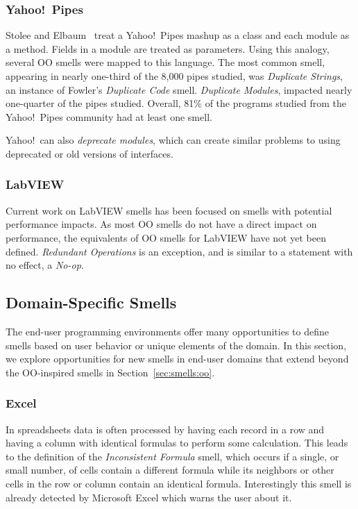 \documentclass{sig-alternate}
\begin{document}
\subsubsection{Yahoo!\ Pipes}
Stolee and Elbaum~\cite{Stolee2011, StoleeTSE2013} treat a Yahoo!\ Pipes mashup as a class and each module as a method.  Fields in a module are treated as parameters. Using this analogy,  several OO smells were mapped to this language. The most common smell, appearing in nearly one-third of the 8,000 pipes studied, was \emph{Duplicate Strings}, an instance of Fowler's \emph{Duplicate Code} smell. 
\emph{Duplicate Modules}, impacted nearly one-quarter of the pipes studied. 
 Overall, 81\% of the programs studied from the Yahoo!\ Pipes community had at least one smell. 
 
Yahoo!\ can also \emph{deprecate modules}, which can create similar problems to using deprecated or old versions of interfaces.

\subsubsection{LabVIEW}

Current work on LabVIEW smells has been focused on smells with potential performance impacts.
As most OO smells do not have a direct impact on performance, the equivalents of OO smells for LabVIEW have not yet been defined.
\emph{Redundant Operations} is an exception, and is similar to a statement with no effect, a \emph{No-op}.

\subsection{Domain-Specific Smells}
\label{sec:smells:domain}
The end-user programming environments offer many opportunities to define smells based on user behavior or unique elements of the domain.
In this section, we explore opportunities for new smells in end-user domains that extend beyond the OO-inspired smells in Section~\ref{sec:smells:oo}. 

\subsubsection{Excel}

In spreadsheets data is often processed by having each record in a row and having a column with identical formulas to perform some calculation.
This leads to the definition of the \emph{Inconsistent Formula} smell, which occurs if a single, or small number, of cells contain a different formula while its neighbors or other cells in the row or column contain an identical formula.
Interestingly this smell is already detected by Microsoft Excel which warns the user about it.
\end{document}
